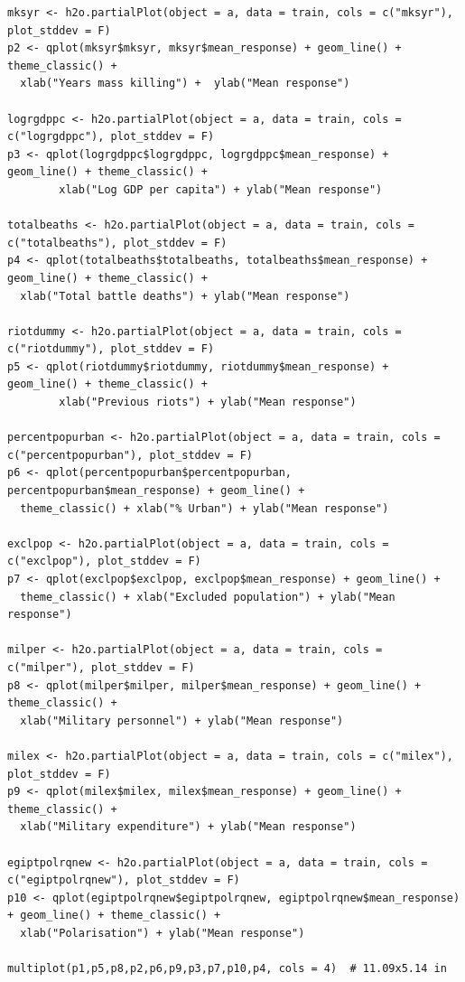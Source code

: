 \begin{verbatim}
mksyr <- h2o.partialPlot(object = a, data = train, cols = c("mksyr"), plot_stddev = F)
p2 <- qplot(mksyr$mksyr, mksyr$mean_response) + geom_line() + theme_classic() + 
  xlab("Years mass killing") +  ylab("Mean response")

logrgdppc <- h2o.partialPlot(object = a, data = train, cols = c("logrgdppc"), plot_stddev = F)
p3 <- qplot(logrgdppc$logrgdppc, logrgdppc$mean_response) + geom_line() + theme_classic() +
        xlab("Log GDP per capita") + ylab("Mean response")

totalbeaths <- h2o.partialPlot(object = a, data = train, cols = c("totalbeaths"), plot_stddev = F)
p4 <- qplot(totalbeaths$totalbeaths, totalbeaths$mean_response) + geom_line() + theme_classic() +
  xlab("Total battle deaths") + ylab("Mean response")

riotdummy <- h2o.partialPlot(object = a, data = train, cols = c("riotdummy"), plot_stddev = F)
p5 <- qplot(riotdummy$riotdummy, riotdummy$mean_response) + geom_line() + theme_classic() +
        xlab("Previous riots") + ylab("Mean response")

percentpopurban <- h2o.partialPlot(object = a, data = train, cols = c("percentpopurban"), plot_stddev = F)
p6 <- qplot(percentpopurban$percentpopurban, percentpopurban$mean_response) + geom_line() +
  theme_classic() + xlab("% Urban") + ylab("Mean response")

exclpop <- h2o.partialPlot(object = a, data = train, cols = c("exclpop"), plot_stddev = F)
p7 <- qplot(exclpop$exclpop, exclpop$mean_response) + geom_line() +
  theme_classic() + xlab("Excluded population") + ylab("Mean response")

milper <- h2o.partialPlot(object = a, data = train, cols = c("milper"), plot_stddev = F)
p8 <- qplot(milper$milper, milper$mean_response) + geom_line() + theme_classic() +
  xlab("Military personnel") + ylab("Mean response")

milex <- h2o.partialPlot(object = a, data = train, cols = c("milex"), plot_stddev = F)
p9 <- qplot(milex$milex, milex$mean_response) + geom_line() + theme_classic() +
  xlab("Military expenditure") + ylab("Mean response")

egiptpolrqnew <- h2o.partialPlot(object = a, data = train, cols = c("egiptpolrqnew"), plot_stddev = F)
p10 <- qplot(egiptpolrqnew$egiptpolrqnew, egiptpolrqnew$mean_response) + geom_line() + theme_classic() +
  xlab("Polarisation") + ylab("Mean response")

multiplot(p1,p5,p8,p2,p6,p9,p3,p7,p10,p4, cols = 4)  # 11.09x5.14 in


\end{verbatim}

